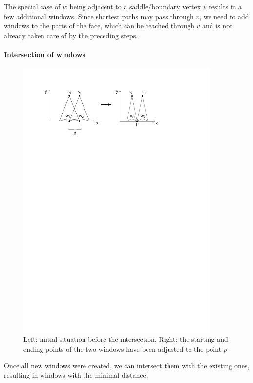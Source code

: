 The special case of $w$ being adjacent to a saddle/boundary vertex $v$ results in a few additional windows.
Since shortest paths may pass through $v$, we need to add windows to the parts of the face, which can be reached through $v$ and is not already taken care of by the preceding steps.

\paragraph{Intersection of windows}
\begin{figure}[h]
	\centering
	\includegraphics[width = 0.9\textwidth]{pictures/geodesics_intersection}
	\caption{Left: initial situation before the intersection. Right: the starting and ending points of the two windows have been adjusted to the point $p$}
	\label{fig:geo_intersect}
\end{figure}
Once all new windows were created, we can intersect them with the existing ones, resulting in windows with the minimal distance.
